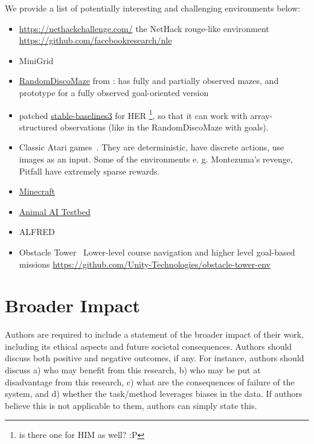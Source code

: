 \documentclass{article}
\begin{document}
We provide a list of potentially interesting and challenging environments below:

\begin{itemize}
  \item \url{https://nethackchallenge.com/} the NetHack rouge-like environment \citep{kuttler_nethack_2020} \url{https://github.com/facebookresearch/nle}

  \item MiniGrid~\citep{gym_minigrid}

  \item \href{https://github.com/ivannz/gymDiscoMaze.git@stable}{RandomDiscoMaze} from \citep[sec.~4.1]{badia_never_2020}: has fully and partially observed mazes, and prototype for a fully observed goal-oriented version

  \item patched \href{https://github.com/ivannz/stable-baselines3.git@her-multibinary-patch}{stable-baselines3} for HER%
  \footnote{
    is there one for HIM as well? :P
  }, so that it can work with array-structured observations (like in the RandomDiscoMaze with goals).

  \item Classic Atari games~\citep{Mnih2013PlayingAW}. They are deterministic, have discrete actions, use images as an input. Some of the environments e. g. Montezuma's revenge, Pitfall have extremely sparse rewards.
  \item \href{https://minerl.io/competition/}{Minecraft}
  \item \href{http://animalaiolympics.com/AAI/}{Animal AI Testbed} 
  \item ALFRED~\citep{ALFRED20}
  \item Obstacle Tower~\citep{juliani_obstacle_2019} Lower-level course navigation and higher level goal-based missions \url{https://github.com/Unity-Technologies/obstacle-tower-env}
 \end{itemize}


\section*{Broader Impact}
Authors are required to include a statement of the broader impact of their work, including
its ethical aspects and future societal consequences.
%
Authors should discuss both positive and negative outcomes, if any. For instance, authors
should discuss
a) who may benefit from this research,
b) who may be put at disadvantage from this research,
c) what are the consequences of failure of the system,
and d) whether the task/method leverages biases in the data.
% 
If authors believe this is not applicable to them, authors can simply state this.
\end{document}

